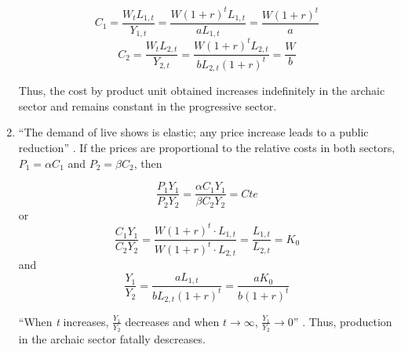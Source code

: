 \documentclass[a4paper, 12pt, openright, oneside, german, french, brazil, english, article]{abntex2}
\begin{document}
\begin{enumerate}
		$$C_1 = \frac{W_tL_{1,t}}{Y_{1,t}} = \frac{W(1+r)^tL_{1,t}}{aL_{1,t}} = \frac{W(1+r)^t}{a}$$
		$$C_2 = \frac{W_tL_{2,t}}{Y_{2,t}} = \frac{W(1+r)^tL_{2,t}}{bL_{2,t}(1+r)^t} = \frac{W}{b}$$
		
		
		Thus, the cost by product unit obtained increases indefinitely in the archaic sector and remains constant in the progressive sector. 
		
		
		
		
		
		\item ``The demand of live shows is elastic; any price increase leads to a public reduction'' \cite[p. 56]{benhamou2007economia}. If the prices are proportional to the relative costs in both sectors, $P_1 = \alpha C_1$ and $P_2 = \beta C_2$, then
		
		$$\frac{P_1Y_1}{P_2Y_2} = \frac{\alpha C_1Y_1}{\beta C_2Y_2} = Cte$$ or
		$$\frac{C_1Y_1}{C_2Y_2} = \frac{W(1+r)^t \cdot L_{1,t}}{W(1+r)^t \cdot L_{2,t}} = \frac{L_{1,t}}{L_{2,t}} = K_0$$ and
		$$\frac{Y_1}{Y_2} = \frac{aL_{1,t}}{bL_{2,t}(1+r)^t} = \frac{aK_0}{b(1+r)^t}$$
		
	
	``When \textit{t} increases, $\frac{Y_1}{Y_2}$ decreases and when $t \rightarrow \infty$, $\frac{Y_1}{Y_2} \rightarrow 0$'' \cite[p. 57]{benhamou2007economia}. Thus, production in the archaic sector fatally descreases.
	
	\end{enumerate}
	
\end{document}
